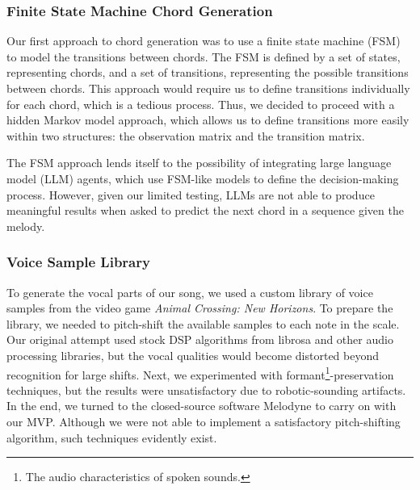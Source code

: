 \subsubsection{Finite State Machine Chord Generation}

Our first approach to chord generation was to use a finite state machine (FSM) to model the transitions between chords. The FSM is defined by a set of states, representing chords, and a set of transitions, representing the possible transitions between chords. This approach would require us to define transitions individually for each chord, which is a tedious process. Thus, we decided to proceed with a hidden Markov model approach, which allows us to define transitions more easily within two structures: the observation matrix and the transition matrix.

The FSM approach lends itself to the possibility of integrating large language model (LLM) agents, which use FSM-like models to define the decision-making process. However, given our limited testing, LLMs are not able to produce meaningful results when asked to predict the next chord in a sequence given the melody.

\subsubsection{Voice Sample Library}

To generate the vocal parts of our song, we used a custom library of voice samples from the video game \emph{Animal Crossing: New Horizons}. To prepare the library, we needed to pitch-shift the available samples to each note in the scale. Our original attempt used stock DSP algorithms from librosa and other audio processing libraries, but the vocal qualities would become distorted beyond recognition for large shifts. Next, we experimented with formant\footnote{The audio characteristics of spoken sounds.}-preservation techniques, but the results were unsatisfactory due to robotic-sounding artifacts. In the end, we turned to the closed-source software Melodyne to carry on with our MVP. Although we were not able to implement a satisfactory pitch-shifting algorithm, such techniques evidently exist.
